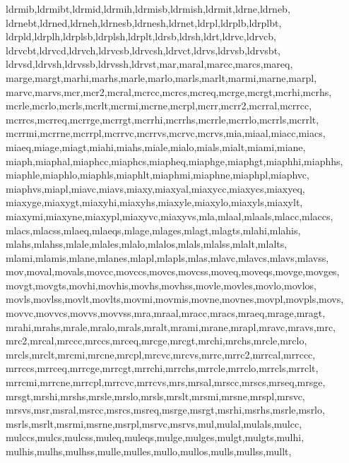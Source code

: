 {{      ldrmib,ldrmibt,ldrmid,ldrmih,ldrmisb,ldrmish,ldrmit,ldrne,ldrneb,       %
      ldrnebt,ldrned,ldrneh,ldrnesb,ldrnesh,ldrnet,ldrpl,ldrplb,ldrplbt,      %
      ldrpld,ldrplh,ldrplsb,ldrplsh,ldrplt,ldrsb,ldrsh,ldrt,ldrvc,ldrvcb,     %
      ldrvcbt,ldrvcd,ldrvch,ldrvcsb,ldrvcsh,ldrvct,ldrvs,ldrvsb,ldrvsbt,      %
      ldrvsd,ldrvsh,ldrvssb,ldrvssh,ldrvst,mar,maral,marcc,marcs,mareq,       %
      marge,margt,marhi,marhs,marle,marlo,marls,marlt,marmi,marne,marpl,      %
      marvc,marvs,mcr,mcr2,mcral,mcrcc,mcrcs,mcreq,mcrge,mcrgt,mcrhi,mcrhs,   %
      mcrle,mcrlo,mcrls,mcrlt,mcrmi,mcrne,mcrpl,mcrr,mcrr2,mcrral,mcrrcc,     %
      mcrrcs,mcrreq,mcrrge,mcrrgt,mcrrhi,mcrrhs,mcrrle,mcrrlo,mcrrls,mcrrlt,  %
      mcrrmi,mcrrne,mcrrpl,mcrrvc,mcrrvs,mcrvc,mcrvs,mia,miaal,miacc,miacs,   %
      miaeq,miage,miagt,miahi,miahs,miale,mialo,mials,mialt,miami,miane,      %
      miaph,miaphal,miaphcc,miaphcs,miapheq,miaphge,miaphgt,miaphhi,miaphhs,  %
      miaphle,miaphlo,miaphls,miaphlt,miaphmi,miaphne,miaphpl,miaphvc,        %
      miaphvs,miapl,miavc,miavs,miaxy,miaxyal,miaxycc,miaxycs,miaxyeq,        %
      miaxyge,miaxygt,miaxyhi,miaxyhs,miaxyle,miaxylo,miaxyls,miaxylt,        %
      miaxymi,miaxyne,miaxypl,miaxyvc,miaxyvs,mla,mlaal,mlaals,mlacc,mlaccs,  %
      mlacs,mlacss,mlaeq,mlaeqs,mlage,mlages,mlagt,mlagts,mlahi,mlahis,       %
      mlahs,mlahss,mlale,mlales,mlalo,mlalos,mlals,mlalss,mlalt,mlalts,       %
      mlami,mlamis,mlane,mlanes,mlapl,mlapls,mlas,mlavc,mlavcs,mlavs,mlavss,  %
      mov,moval,movals,movcc,movccs,movcs,movcss,moveq,moveqs,movge,movges,   %
      movgt,movgts,movhi,movhis,movhs,movhss,movle,movles,movlo,movlos,       %
      movls,movlss,movlt,movlts,movmi,movmis,movne,movnes,movpl,movpls,movs,  %
      movvc,movvcs,movvs,movvss,mra,mraal,mracc,mracs,mraeq,mrage,mragt,      %
      mrahi,mrahs,mrale,mralo,mrals,mralt,mrami,mrane,mrapl,mravc,mravs,mrc,  %
      mrc2,mrcal,mrccc,mrccs,mrceq,mrcge,mrcgt,mrchi,mrchs,mrcle,mrclo,       %
      mrcls,mrclt,mrcmi,mrcne,mrcpl,mrcvc,mrcvs,mrrc,mrrc2,mrrcal,mrrccc,     %
      mrrccs,mrrceq,mrrcge,mrrcgt,mrrchi,mrrchs,mrrcle,mrrclo,mrrcls,mrrclt,  %
      mrrcmi,mrrcne,mrrcpl,mrrcvc,mrrcvs,mrs,mrsal,mrscc,mrscs,mrseq,mrsge,   %
      mrsgt,mrshi,mrshs,mrsle,mrslo,mrsls,mrslt,mrsmi,mrsne,mrspl,mrsvc,      %
      mrsvs,msr,msral,msrcc,msrcs,msreq,msrge,msrgt,msrhi,msrhs,msrle,msrlo,  %
      msrls,msrlt,msrmi,msrne,msrpl,msrvc,msrvs,mul,mulal,mulals,mulcc,       %
      mulccs,mulcs,mulcss,muleq,muleqs,mulge,mulges,mulgt,mulgts,mulhi,       %
      mulhis,mulhs,mulhss,mulle,mulles,mullo,mullos,mulls,mullss,mullt,       %
}}
